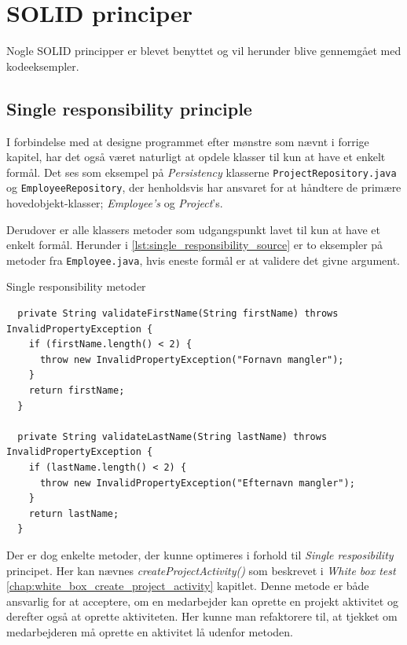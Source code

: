 \section{SOLID principer} \label{chap:solid}
Nogle SOLID principper er blevet benyttet og vil herunder blive gennemgået med kodeeksempler.

\subsection{Single responsibility principle} \label{sec:solid_s}
I forbindelse med at designe programmet efter mønstre som nævnt i forrige kapitel, har det også været naturligt at opdele klasser til kun at have et enkelt formål. Det ses som eksempel på \textit{Persistency} klasserne \texttt{ProjectRepository.java} og \texttt{EmployeeRepository}, der henholdsvis har ansvaret for at håndtere de primære hovedobjekt-klasser; \textit{Employee's} og \textit{Project}'s.

Derudover er alle klassers metoder som udgangspunkt lavet til kun at have et enkelt formål. Herunder i \ref{lst:single_responsibility_source} er to eksempler på metoder fra \texttt{Employee.java}, hvis eneste formål er at validere det givne argument.
\begin{listing}[H]
    \centering
    \caption{Single responsibility metoder}\label{lst:single_responsibility_source}
    \begin{verbatim}
  private String validateFirstName(String firstName) throws InvalidPropertyException {
    if (firstName.length() < 2) {
      throw new InvalidPropertyException("Fornavn mangler");
    }
    return firstName;
  }

  private String validateLastName(String lastName) throws InvalidPropertyException {
    if (lastName.length() < 2) {
      throw new InvalidPropertyException("Efternavn mangler");
    }
    return lastName;
  }

    \end{verbatim}
\end{listing}
Der er dog enkelte metoder, der kunne optimeres i forhold til \textit{Single resposibility} principet. Her kan nævnes \textit{createProjectActivity()} som beskrevet i \textit{White box test} \ref{chap:white_box_create_project_activity} kapitlet. Denne metode er både ansvarlig for at acceptere, om en medarbejder kan oprette en projekt aktivitet og derefter også at oprette aktiviteten. Her kunne man refaktorere til, at tjekket om medarbejderen må oprette en aktivitet lå udenfor metoden.

